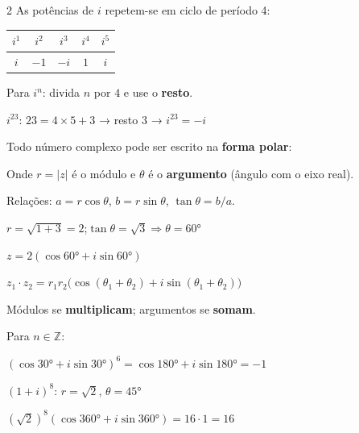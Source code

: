 \documentclass[12pt]{article}
\begin{document}
\begin{multicols}{2}
As potências de $i$ repetem-se em ciclo de período 4:

\vspace{0.2cm}
\begin{center}
\begin{tabular}{|c|c|c|c|c|}
\hline
$i^1$ & $i^2$ & $i^3$ & $i^4$ & $i^5$\\
\hline
$i$ & $-1$ & $-i$ & $1$ & $i$\\
\hline
\end{tabular}
\end{center}
\vspace{0.2cm}

Para $i^n$: divida $n$ por $4$ e use o \textbf{resto}.


$i^{23}$: $23 = 4 \times 5 + 3$ → resto $3$ → $\boxed{i^{23} = -i}$


Todo número complexo pode ser escrito na \textbf{forma polar}:


Onde $r = |z|$ é o módulo e $\theta$ é o \textbf{argumento} (ângulo com o eixo real).

Relações: $a = r\cos\theta$, $b = r\sin\theta$, $\tan\theta = b/a$.


$r = \sqrt{1+3} = 2$;\quad $\tan\theta = \sqrt{3} \Rightarrow \theta = 60°$

$\boxed{z = 2(\cos 60° + i\sin 60°)}$


$z_1 \cdot z_2 = r_1 r_2\bigl(\cos(\theta_1+\theta_2)+i\sin(\theta_1+\theta_2)\bigr)$

Módulos se \textbf{multiplicam}; argumentos se \textbf{somam}.


Para $n \in \mathbb{Z}$:



$(\cos 30°+i\sin 30°)^6 = \cos 180°+i\sin 180° = \boxed{-1}$


$(1+i)^8$: $r=\sqrt{2}$, $\theta=45°$

$(\sqrt{2})^8(\cos 360°+i\sin 360°) = 16 \cdot 1 = \boxed{16}$

\end{multicols}


\end{document}
